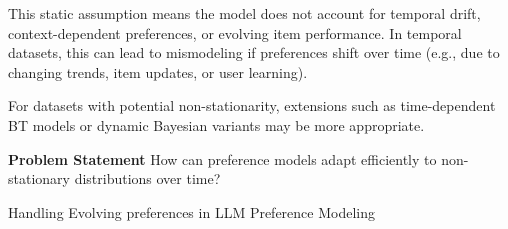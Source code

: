 \documentclass[sigconf]{acmart}
\begin{document}
This static assumption means the model does not account for temporal drift, context-dependent preferences, or evolving item performance. In temporal datasets, this can lead to mismodeling if preferences shift over time (e.g., due to changing trends, item updates, or user learning).

For datasets with potential non-stationarity, extensions such as time-dependent BT models or dynamic Bayesian variants may be more appropriate.

\textbf{Problem Statement} How can preference models adapt efficiently to non-stationary distributions over time?

\begin{table}[h]
\caption{Handling Evolving preferences  in LLM Preference Modeling}
\begin{adjustbox}{width=\linewidth}


\end{adjustbox}
\end{table}
\end{document}
